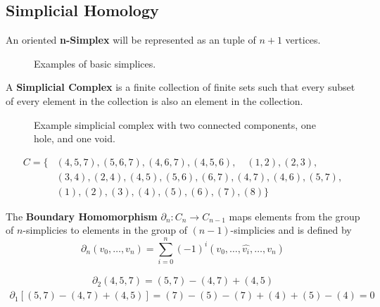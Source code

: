\subsection{Simplicial Homology}
\begin{frame}
	\begin{definition}
		An oriented \textbf{n-Simplex} will be represented as an tuple of \(n+1\) vertices.
	\end{definition}
	\begin{figure}
		
		\caption{Examples of basic simplices.}
	\end{figure}
\end{frame}

\begin{frame}
	\begin{definition}
		A \textbf{Simplicial Complex} is a finite collection of finite sets such that every subset of every element in the collection is also an element in the collection. \cite{wagner}
	\end{definition}
	\begin{figure}
		
		\caption{Example simplicial complex with two connected components, one hole, and one void.}
	\end{figure}
	\begin{align*}
		C = \{
			&(4,5,7), (5,6,7), (4,6,7), (4,5,6),\quad (1,2), (2,3),\\ &(3,4), (2,4), (4,5), (5,6),(6,7),(4,7),(4,6),(5,7),\\
			&(1), (2), (3), (4), (5), (6), (7), (8)
		\}
	\end{align*}
\end{frame}

\begin{frame}
	\begin{definition}
		The \textbf{Boundary Homomorphism} \(\partial_n : C_n \to C_{n-1}\) maps elements from the group of \(n\)-simplicies to elements in the group of \((n-1)\)-simplicies and is defined by
		\[
			\partial_n (v_0,\dots , v_{n}) = \sum_{i=0}^n (-1)^{i}
			(v_0,\dots, \widehat{v_i}, \dots, v_n)
		\]
		\cite{hatcher}
	\end{definition}
	\begin{align*}
		\partial_2 (4,5,7) = (5,7) - (4,7) + (4,5)
	\end{align*}
	\begin{align*}
		\partial_1 [(5,7) - (4,7) + (4,5)] = (7) - (5) - (7) + (4) + (5) - (4) = 0
	\end{align*}
\end{frame}

